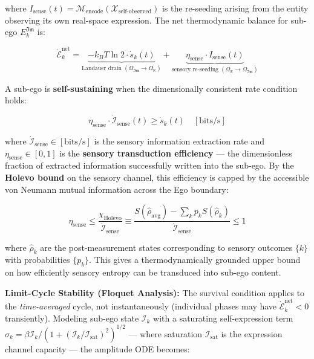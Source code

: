 \documentclass[11pt,a4paper]{article}
\theoremstyle{definition}
\theoremstyle{remark}
\begin{document}
where $I_{\text{sense}}(t) = \mathcal{M}_{\text{encode}}(\mathcal{X}_{\text{self-observed}})$ is the re-seeding arising from the entity observing its own real-space expression. The net thermodynamic balance for sub-ego $E_k^{\mathfrak{Im}}$ is:


\begin{equation}
\boxed{\dot{\mathcal{E}}_{k}^{\text{net}} = \underbrace{-k_B T \ln 2 \cdot \dot{s}_k(t)}_{\text{Landauer drain }(\Omega_{\mathfrak{Im}} \to \Omega_{\mathbb{R}})} + \underbrace{\eta_{\text{sense}} \cdot I_{\text{sense}}(t)}_{\text{sensory re-seeding }(\Omega_{\mathbb{R}} \to \Omega_{\mathfrak{Im}})}}
\end{equation}


A sub-ego is \textbf{self-sustaining} when the dimensionally consistent rate condition holds:


\begin{equation}
\boxed{\eta_{\text{sense}} \cdot \dot{\mathcal{I}}_{\text{sense}}(t) \geq \dot{s}_k(t) \quad [\text{bits/s}]}
\end{equation}


where $\dot{\mathcal{I}}_{\text{sense}} \in [\text{bits/s}]$ is the sensory information extraction rate and $\eta_{\text{sense}} \in [0, 1]$ is the \textbf{sensory transduction efficiency} — the dimensionless fraction of extracted information successfully written into the sub-ego. By the \textbf{Holevo bound} on the sensory channel, this efficiency is capped by the accessible von Neumann mutual information across the Ego boundary:


\begin{equation}
\boxed{\eta_{\text{sense}} \leq \frac{\chi_{\text{Holevo}}}{\dot{\mathcal{I}}_{\text{sense}}} \equiv \frac{S(\hat{\rho}_{\text{avg}}) - \sum_k p_k S(\hat{\rho}_k)}{\dot{\mathcal{I}}_{\text{sense}}} \leq 1}
\end{equation}


where $\hat{\rho}_k$ are the post-measurement states corresponding to sensory outcomes $\{k\}$ with probabilities $\{p_k\}$. This gives a thermodynamically grounded upper bound on how efficiently sensory entropy can be transduced into sub-ego content.

\textbf{Limit-Cycle Stability (Floquet Analysis):} The survival condition applies to the \textit{time-averaged} cycle, not instantaneously (individual phases may have $\dot{\mathcal{E}}_k^{\text{net}} < 0$ transiently). Modeling sub-ego state $\mathcal{I}_k$ with a saturating self-expression term $\sigma_k = \beta \mathcal{I}_k / (1 + (\mathcal{I}_k/\mathcal{I}_{\text{sat}})^2)^{1/2}$ — where saturation $\mathcal{I}_{\text{sat}}$ is the expression channel capacity — the amplitude ODE becomes:
\end{document}
